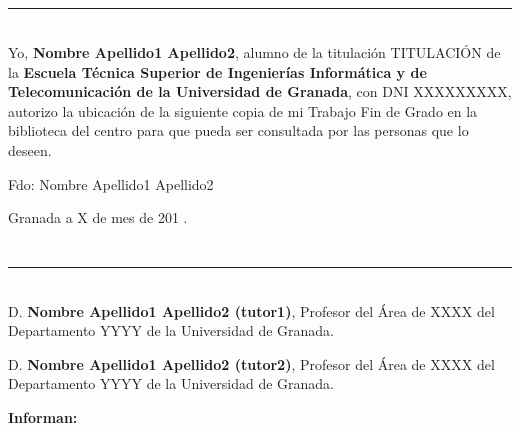 \\

\vspace{0.7cm}
\\



\chapter*{}
\thispagestyle{empty}

\noindent\rule[-1ex]{\textwidth}{2pt}\\[4.5ex]

Yo, \textbf{Nombre Apellido1 Apellido2}, alumno de la titulación TITULACIÓN de la \textbf{Escuela Técnica Superior
de Ingenierías Informática y de Telecomunicación de la Universidad de Granada}, con DNI XXXXXXXXX, autorizo la
ubicación de la siguiente copia de mi Trabajo Fin de Grado en la biblioteca del centro para que pueda ser
consultada por las personas que lo deseen.

\vspace{6cm}

\noindent Fdo: Nombre Apellido1 Apellido2

\vspace{2cm}

\begin{flushright}
Granada a X de mes de 201 .
\end{flushright}


\chapter*{}
\thispagestyle{empty}

\noindent\rule[-1ex]{\textwidth}{2pt}\\[4.5ex]

D. \textbf{Nombre Apellido1 Apellido2 (tutor1)}, Profesor del Área de XXXX del Departamento YYYY de la Universidad de Granada.

\vspace{0.5cm}

D. \textbf{Nombre Apellido1 Apellido2 (tutor2)}, Profesor del Área de XXXX del Departamento YYYY de la Universidad de Granada.


\vspace{0.5cm}

\textbf{Informan:}

